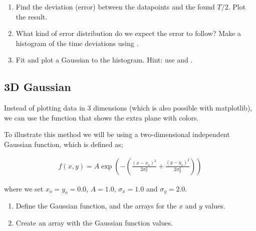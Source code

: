 \documentclass{article}
\begin{document}
\begin{enumerate}[resume]

    \item Find the deviation (error) between the datapoints and the found $T/2$. 
          Plot the result.

    \item What kind of error distribution do we expect the error to follow?
          Make a histogram of the time deviations using . 

    \item Fit and plot a Gaussian to the histogram.
          {Hint: use  and .}
          

\end{enumerate}

%
%
%

\newpage
\subsection{3D Gaussian}

Instead of plotting data in 3 dimensions (which is also possible with matplotlib), we can use the  function that shows the extra plane with colors.

To illustrate this method we will be using a two-dimensional independent Gaussian function, which is defined as;

\begin{align}
  f(x,y) = A \exp \left ( - \left ( \frac{(x - x_o)^2}{2\sigma_x^2} + \frac{(y - y_o)^2}{2\sigma_y^2} \right ) \right )
\end{align}

where we set $x_o = y_o = 0.0$, $A = 1.0$, $\sigma_x = 1.0$ and $\sigma_y = 2.0$.\\


\begin{enumerate}

    \item Define the Gaussian function, and the arrays for the $x$ and $y$ values.

    \item Create an array  with the Gaussian function values.

\end{enumerate}
\end{document}
